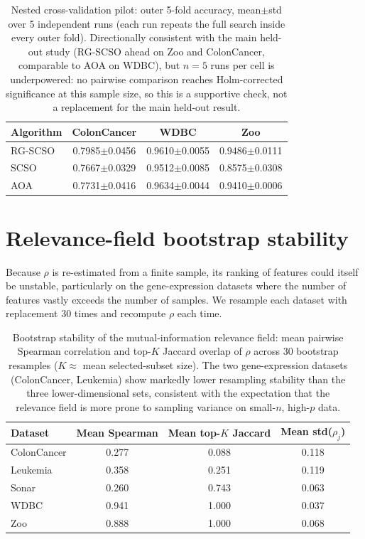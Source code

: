 \documentclass[9pt]{article}
\begin{document}
\begin{table}[t]
\centering
\caption{Nested cross-validation pilot: outer 5-fold accuracy, mean$\pm$std over 5 independent runs (each run repeats the full search inside every outer fold). Directionally consistent with the main held-out study (RG-SCSO ahead on Zoo and ColonCancer, comparable to AOA on WDBC), but $n=5$ runs per cell is underpowered: no pairwise comparison reaches Holm-corrected significance at this sample size, so this is a supportive check, not a replacement for the main held-out result.}
\label{tab:nestedcv}
\footnotesize
\begin{tabular}{lccc}
\toprule
Algorithm & ColonCancer & WDBC & Zoo \\
\midrule
RG-SCSO & 0.7985$\pm$0.0456 & 0.9610$\pm$0.0055 & 0.9486$\pm$0.0111 \\
SCSO & 0.7667$\pm$0.0329 & 0.9512$\pm$0.0085 & 0.8575$\pm$0.0308 \\
AOA & 0.7731$\pm$0.0416 & 0.9634$\pm$0.0044 & 0.9410$\pm$0.0006 \\
\bottomrule
\end{tabular}
\end{table}


\FloatBarrier
\section{Relevance-field bootstrap stability}
Because $\rho$ is re-estimated from a finite sample, its
ranking of features could itself be unstable, particularly on the
gene-expression datasets where the number of features vastly exceeds the
number of samples. We resample each dataset with replacement 30 times and
recompute $\rho$ each time.

\begin{table}[t]
\centering
\caption{Bootstrap stability of the mutual-information relevance field: mean pairwise Spearman correlation and top-$K$ Jaccard overlap of $\rho$ across 30 bootstrap resamples ($K\approx$ mean selected-subset size). The two gene-expression datasets (ColonCancer, Leukemia) show markedly lower resampling stability than the three lower-dimensional sets, consistent with the expectation that the relevance field is more prone to sampling variance on small-$n$, high-$p$ data.}
\label{tab:relvar}
\footnotesize
\begin{tabular}{lccc}
\toprule
Dataset & Mean Spearman & Mean top-$K$ Jaccard & Mean std($\rho_j$) \\
\midrule
ColonCancer & 0.277 & 0.088 & 0.118 \\
Leukemia & 0.358 & 0.251 & 0.119 \\
Sonar & 0.260 & 0.743 & 0.063 \\
WDBC & 0.941 & 1.000 & 0.037 \\
Zoo & 0.888 & 1.000 & 0.068 \\
\bottomrule
\end{tabular}
\end{table}
\end{document}
